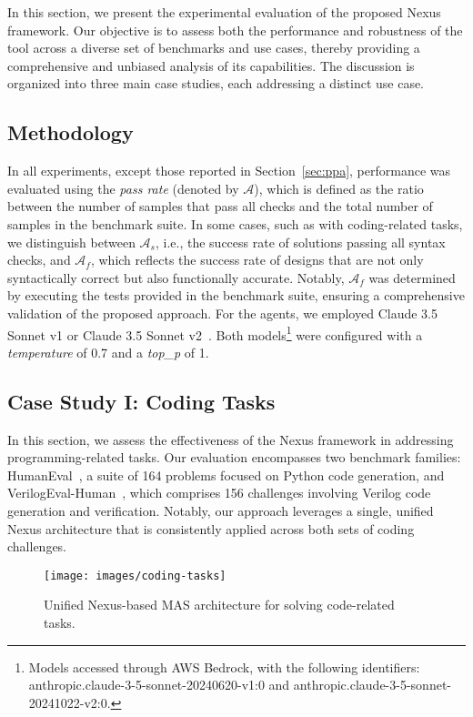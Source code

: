 In this section, we present the experimental evaluation of the proposed Nexus framework. Our objective is to assess both the performance and robustness of the tool across a diverse set of benchmarks and use cases, thereby providing a comprehensive and unbiased analysis of its capabilities. The discussion is organized into three main case studies, each addressing a distinct use case.

\subsection{Methodology}

In all experiments, except those reported in Section~\ref{sec:ppa}, performance was evaluated using the {\em pass rate} (denoted by $\mathcal{A}$), which is defined as the ratio between the number of samples that pass all checks and the total number of samples in the benchmark suite. In some cases, such as with coding-related tasks, we distinguish between $\mathcal{A}_{s}$, i.e., the success rate of solutions passing all syntax checks, and $\mathcal{A}_{f}$, which reflects the success rate of designs that are not only syntactically correct but also functionally accurate. Notably, $\mathcal{A}_{f}$ was determined by executing the tests provided in the benchmark suite, ensuring a comprehensive validation of the proposed approach. For the agents, we employed Claude 3.5 Sonnet v1 or Claude 3.5 Sonnet v2~\cite{claude3.5}. Both models\footnote{Models accessed through AWS Bedrock, with the following identifiers: anthropic.claude-3-5-sonnet-20240620-v1:0 and anthropic.claude-3-5-sonnet-20241022-v2:0.} were configured with a {\em temperature} of 0.7 and a {\em top\_p} of 1.

\subsection{Case Study I: Coding Tasks}

In this section, we assess the effectiveness of the Nexus framework in addressing programming-related tasks. Our evaluation encompasses two benchmark families: HumanEval~\cite{chen2021evaluating}, a suite of 164 problems focused on Python code generation, and VerilogEval-Human~\cite{liu2023verilogeval}, which comprises 156 challenges involving Verilog code generation and verification. Notably, our approach leverages a single, unified Nexus architecture that is consistently applied across both sets of coding challenges.

\begin{figure}[h]
    \centering
    \texttt{[image: images/coding-tasks]}
    \caption{Unified Nexus-based MAS architecture for solving code-related tasks.}
    \label{fig:coding_arch}
\end{figure}

